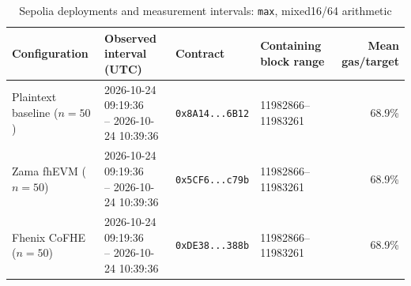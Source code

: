 \begin{table}[!t]
\caption{Sepolia deployments and measurement intervals: \texttt{max}, mixed16/64 arithmetic}
\label{tab:sepolia-experiment-deployments-reference-mixed-oct24-max}
\centering
\footnotesize
\setlength{\tabcolsep}{4pt}
\begin{tabular}{|l|l|l|l|r|}
\hline
\textbf{Configuration} &
\textbf{Observed interval (UTC)} &
\textbf{Contract} &
\textbf{Containing block range} &
\textbf{Mean gas/target} \\
\hline
Plaintext baseline (\(n=50\)) &
\shortstack[l]{2026-10-24 09:19:36 \\ -- 2026-10-24 10:39:36} &
\texttt{0x8A14...6B12} &
11982866--11983261 &
68.9\% \\
\hline
Zama fhEVM (\(n=50\)) &
\shortstack[l]{2026-10-24 09:19:36 \\ -- 2026-10-24 10:39:36} &
\texttt{0x5CF6...c79b} &
11982866--11983261 &
68.9\% \\
\hline
Fhenix CoFHE (\(n=50\)) &
\shortstack[l]{2026-10-24 09:19:36 \\ -- 2026-10-24 10:39:36} &
\texttt{0xDE38...388b} &
11982866--11983261 &
68.9\% \\
\hline
\end{tabular}
\end{table}
